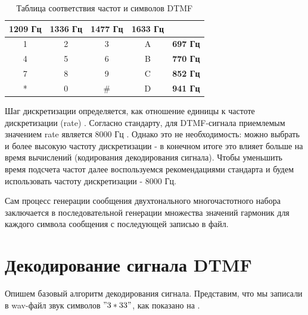 \begin{table}[ht]
\centering\small
	\caption{Таблица соответствия частот и символов DTMF \cite{dtmf}}
	\label{tab:lrt}	
\begin{tabular}{|c|c|c|c|l|}
\hline
\multicolumn{1}{|l|}{\textbf{1209 Гц}} & \multicolumn{1}{l|}{\textbf{1336 Гц}} & \multicolumn{1}{l|}{\textbf{1477 Гц}} & \multicolumn{1}{l|}{\textbf{1633 Гц}} &                 \\ \hline
1                                      & 2                                     & 3                                     & A                                     & \textbf{697 Гц} \\ \hline
4                                      & 5                                     & 6                                     & B                                     & \textbf{770 Гц} \\ \hline
7                                      & 8                                     & 9                                     & C                                     & \textbf{852 Гц} \\ \hline
*                                      & 0                                     & \#                                    & D                                     & \textbf{941 Гц} \\ \hline
\end{tabular}\normalsize%
\end{table}

Шаг дискретизации определяется, как отношение единицы к частоте дискретизации (rate) \cite{bel}. Согласно стандарту, для DTMF-сигнала приемлемым значением rate является 8000 Гц \cite{dtmf}. Однако это не необходимость: можно выбрать и более высокую частоту дискретизации - в конечном итоге это влияет больше на время вычислений (кодирования \/ декодирования сигнала). Чтобы уменьшить время подсчета частот далее воспользуемся рекомендациями стандарта и будем использовать частоту дискретизации - 8000 Гц.

Сам процесс генерации сообщения двухтонального многочастотного набора заключается в последовательной генерации множества значений гармоник для каждого символа сообщения с последующей записью в файл.

\section{Декодирование сигнала DTMF}

Опишем базовый алгоритм декодирования сигнала. Представим, что мы записали в wav-файл звук символов $"3*33"$, как показано на .

